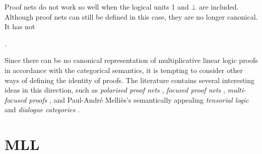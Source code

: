 \documentclass{lmcs}
\let\capsabbrev=\uppercase
\begin{document}
Proof nets do not work so well when the logical units 1 and $\bot$ are included. Although
proof nets can still be defined in this case, they are no longer canonical. It has not

\cite{Lambek-1968}

\cite{Girard-1987,Danos-Regnier-1989}
\cite{Trimble-1994,Blute-Cockett-Seely-Trimble-1996}
\cite{Koh-Ong-1999}
\cite{Lamarche-Strassburger-2006}
\cite{Hughes-2012-categories,Hughes-2012-nets}


\cite{Hughes-vanGlabbeek-2005}
\cite{Heijltjes-2011}

\cite{Demaine-Hearn-2008}

\cite{ReconfigurationProblems}
\cite{Kanovich-1992,Lincoln-Winkler-1994}.



Since there can be no canonical representation of multiplicative linear logic proofs in accordance with the categorical semantics, it is tempting to consider other ways of defining the identity of proofs. The literature contains several interesting ideas in this direction, such as \emph{polarised proof nets} \cite{Laurent-1999}, \emph{focused proof nets} \cite{Andreoli-Maieli-1999}, \emph{multi-focused proofs} \cite{Chaudhuri-Miller-Saurin-2008}, and Paul-Andr\'e Melli\`es's semantically appealing \emph{tensorial logic} and \emph{dialogue categories} \cite{Mellies-2012}.



\section{\protect\capsabbrev{mll}}
\end{document}
